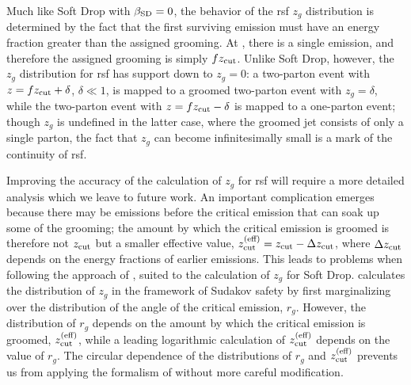 Much like Soft Drop with \(\beta_{\rm SD} = 0\), the  behavior of the \gls{rsf} \(z_g\) distribution is determined by the fact that the first surviving emission must have an energy fraction greater than the assigned grooming.
%
At , there is a single emission, and therefore the assigned grooming is simply \(f z_{\rm cut}\).
%
Unlike Soft Drop, however, the \(z_g\) distribution for \gls{rsf} has support down to \(z_g = 0\):
%
a two-parton event with \(z = f z_{\rm cut} + \delta\), \(\delta \ll 1\), is mapped to a groomed two-parton event with \(z_g = \delta\), while the two-parton event with \(z = f z_{\rm cut} - \delta\) is mapped to a one-parton event;
%
though \(z_g\) is undefined in the latter case, where the groomed jet consists of only a single parton, the fact that \(z_g\) can become infinitesimally small is a mark of the continuity of \gls{rsf}.

Improving the accuracy of the calculation of \(z_g\) for \gls{rsf} will require a more detailed analysis which we leave to future work.
%
An important complication emerges because there may be emissions before the critical emission that can soak up some of the grooming;
%
the amount by which the critical emission is groomed is therefore not \(z_{\rm cut}\) but a smaller effective value, \(z_{\rm cut}^{\rm(eff)} = z_{\rm cut} - \Delta z_{\rm cut}\), where \(\Delta z_{\rm cut}\) depends on the energy fractions of earlier emissions.
%
This leads to problems when following the approach of , suited to the calculation of \(z_g\) for Soft Drop.
%
 calculates the distribution of \(z_g\) in the framework of Sudakov safety by first marginalizing over the distribution of the angle of the critical emission, \(r_g\).
%
However, the distribution of \(r_g\) depends on the amount by which the critical emission is groomed, \(z_{\rm cut}^{(\rm eff)}\), while a leading logarithmic calculation of \(z_{\rm cut}^{(\rm eff)}\) depends on the value of \(r_g\).
%
The circular dependence of the distributions of \(r_g\) and \(z_{\rm cut}^{\rm(eff)}\) prevents us from applying the formalism of  without more careful modification.


